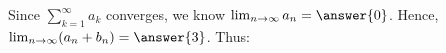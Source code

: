 \documentclass{ximera}
\begin{document}
\begin{exercise}
\begin{exercise}
\begin{exercise}
\begin{hint}
Since $\sum_{k=1}^{\infty} a_k$ converges, we know $\lim_{n \to \infty} a_n = \answer{0}$.  Hence, $\lim_{n \to \infty} (a_n+b_n) = \answer{3}$.  Thus:

\begin{multipleChoice}
\end{multipleChoice}
\end{hint}
\end{exercise}
\end{exercise}
\end{exercise}
\end{document}
